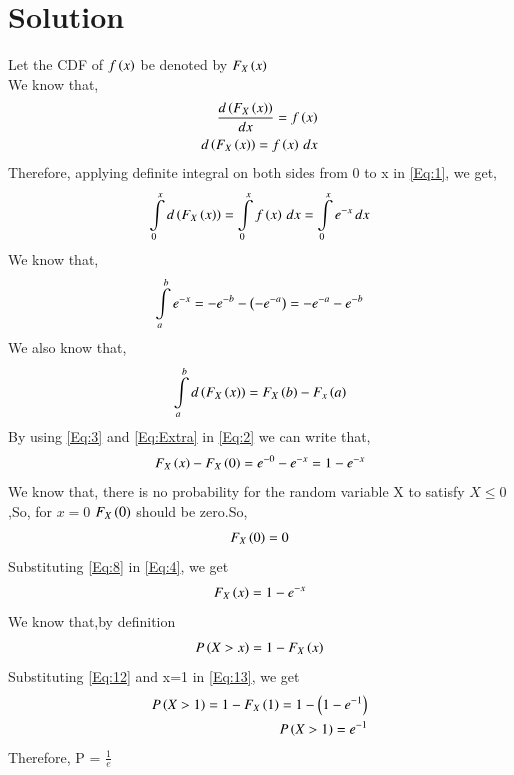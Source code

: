 \documentclass[journal,12pt,twocolumn]{IEEEtran}
\begin{document}
\section{Solution}
Let the CDF of $f\left(x\right)$ be denoted by $F_X\left(x\right)$ \\
We know that,
\begin{align}
\frac{d\left(F_X\left(x\right)\right)}{dx} = f\left(x\right) \notag \\
d\left(F_X\left(x\right)\right) = f\left(x\right) \,dx \label{Eq:1}
\end{align}
Therefore, applying definite integral on both sides from 0 to x in \eqref{Eq:1}, we get,
\begin{align}
\int\limits_{0}^{x} d\left(F_X\left(x\right)\right) = \int\limits_{0}^{x} f\left(x\right) \,dx = \int\limits_{0}^{x} e^{-x} \,dx \label{Eq:2}
\end{align}
We know that,
\begin{align}
\int\limits_{a}^{b} e^{-x} = -e^{-b}-\left(-e^{-a}\right) = -e^{-a}-e^{-b}  \label{Eq:3}
\end{align}
We also know that,
\begin{align}
\int\limits_{a}^{b} d\left(F_X\left(x\right)\right) = F_X\left(b\right) - F_x\left(a\right) \label{Eq:Extra}
\end{align}
By using \eqref{Eq:3} and \eqref{Eq:Extra} in \eqref{Eq:2} we can write that,
\begin{align}
F_X\left(x\right) - F_X\left(0\right) = e^{-0} - e^{-x} = 1 - e^{-x}   \label{Eq:4}
\end{align}
We know that, there is no probability for the random variable X to satisfy $X \leq 0$,So, for $x = 0$ $F_X\left(0\right)$ should be zero.So,
\begin{align}
F_X\left(0\right) = 0 \label{Eq:8}
\end{align}
Substituting \eqref{Eq:8} in \eqref{Eq:4}, we get
\begin{align}
F_X\left(x\right) = 1 - e^{-x} \label{Eq:12}
\end{align}
We know that,by definition 
\begin{align}
P\left(X > x\right) = 1-F_X\left(x\right) \label{Eq:13}
\end{align}
Substituting \eqref{Eq:12} and x=1 in \eqref{Eq:13}, we get
\begin{align}
P\left(X>1\right)=1-F_X\left(1\right)=1-\left(1-e^{-1}\right) \\
P\left(X>1\right)=e^{-1}
\end{align}
Therefore, P = $\frac{1}{e}$
\newpage
\end{document}

